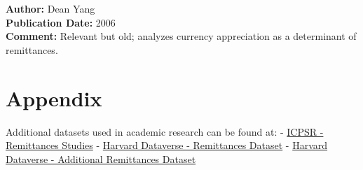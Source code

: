 \documentclass[
  11pt,
]{article}
\begin{document}
\textbf{Author:} Dean Yang\\
\textbf{Publication Date:} 2006\\
\textbf{Comment:} Relevant but old; analyzes currency appreciation as a
determinant of remittances.

\section{Appendix}\label{appendix}

Additional datasets used in academic research can be found at: -
\href{https://www.icpsr.umich.edu/web/ICPSR/search/studies?start=0&sort=score\%20desc\%2CTITLE_SORT\%20asc&ARCHIVE=ICPSR&PUBLISH_STATUS=PUBLISHED&rows=50&q=Remittances}{ICPSR
- Remittances Studies} -
\href{https://dataverse.harvard.edu/dataset.xhtml?persistentId=doi:10.7910/DVN/I6VB8V}{Harvard
Dataverse - Remittances Dataset} -
\href{https://dataverse.harvard.edu/dataset.xhtml?persistentId=doi:10.7910/DVN/SV0PIW}{Harvard
Dataverse - Additional Remittances Dataset}


\printbibliography
\end{document}
